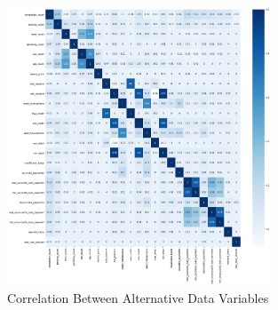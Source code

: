 \begin{figure}[!htb]
\centering
\includegraphics[width=0.7\textwidth]{images/alt_corr.png}
\caption{Correlation Between Alternative Data Variables}
\label{fig:alt_cor}
\end{figure}

\vspace{10 pt}

